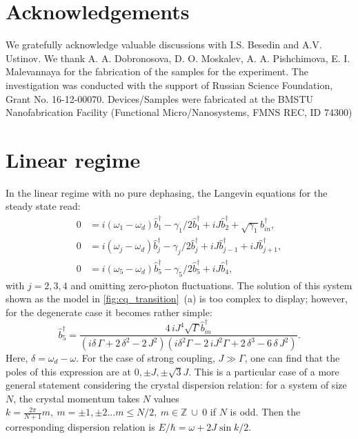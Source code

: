 \documentclass[%
 aps, pra,
 amsmath,amssymb,
 reprint,%
superscriptaddress
]{revtex4-2}
\begin{document}
\section{Acknowledgements}

We gratefully acknowledge valuable discussions with I.S. Besedin and A.V. Ustinov. We thank  A. A. Dobronosova, D. O. Moskalev, A. A. Pishchimova, E. I. Malevannaya for the fabrication of the samples for the experiment. The investigation was conducted with the support of Russian Science Foundation, Grant No. 16-12-00070. Devices/Samples were fabricated at the BMSTU Nanofabrication Facility (Functional Micro/Nanosystems, FMNS REC, ID 74300)


\appendix

\section{Linear regime} \label{sec:app_linear}

In the linear regime with no pure dephasing, the Langevin equations for the steady state read:
\begin{equation}
\begin{aligned}
0 &= i(\omega_1 - \omega_d)\hat b_1^\dag - \gamma_1/2 \hat b_1^\dag + i J\hat b_2^\dag + \sqrt{\gamma_1}b_{in}^\dag,\\
0 &= i(\omega_j - \omega_d)\hat b_j^\dag - \gamma_j/2 \hat b_{j}^\dag + i J\hat b_{j-1}^\dag + i J\hat b_{j+1}^\dag,\\
0 &= i(\omega_5 - \omega_d)\hat b_5^\dag - \gamma_5/2 \hat b_5^\dag + i J\hat b_4^\dag,
\end{aligned} 
\end{equation}
with $j = 2,3,4$ and omitting zero-photon fluctuations. The solution of this system shown as the model in \autoref{fig:cq_transition}~(a) is too complex to display; however, for the degenerate case it becomes rather simple:
\begin{equation}
\hat b_{{5}}^\dag={\frac {4\,i{J}^{4}\sqrt {\Gamma} \hat b_{in}^\dag}{ \left( i\delta\,
\Gamma+2\,{\delta}^{2}-2\,{J}^{2} \right)  \left( i{\delta}^{2}
\Gamma-2\,i{J}^{2}\Gamma+2\,{\delta}^{3}-6\,\delta\,{J}^{2
} \right) }}.
\end{equation}
Here, $\delta = \omega_d - \omega$. For the case of strong coupling, $J\gg \Gamma$, one can find that the poles of this expression are at $0, \pm J, \pm \sqrt 3 J $. This is a particular case of a more general statement considering the crystal dispersion relation: for a system of size $N$, the crystal momentum takes $N$ values $k = \frac{2 \pi}{N+1} m,\ m=\pm 1, \pm 2... m \leq N/2,\ m\in \mathbb{Z}\  \cup\ {0}$ if $ N $ is odd. Then the corresponding dispersion relation is $E/\hbar = \omega + 2 J \sin k/2$.
\end{document}
